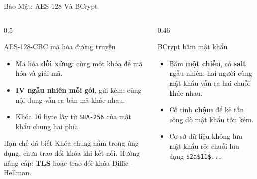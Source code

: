 \begin{frame}{Bảo Mật: AES-128 Và BCrypt}
  \begin{columns}[T]
    \begin{column}{0.5\textwidth}
      \begin{block}{AES-128-CBC \cite{ref3} mã hóa đường truyền}
        \begin{itemize}\setlength{\itemsep}{0pt}
          \item Mã hóa \textbf{đối xứng}: cùng một khóa để mã hóa và giải mã.
          \item \textbf{IV ngẫu nhiên mỗi gói}, gửi kèm: cùng nội dung vẫn ra bản mã khác nhau.
          \item Khóa 16 byte lấy từ \texttt{SHA-256} của mật khẩu chung hai phía.
        \end{itemize}
      \end{block}
      \begin{alertblock}{Hạn chế đã biết}
        Khóa chung nằm trong ứng dụng, chưa trao đổi khóa khi kết nối. Hướng nâng cấp: \textbf{TLS} hoặc trao đổi khóa Diffie--Hellman.
      \end{alertblock}
    \end{column}
    \begin{column}{0.46\textwidth}
      \begin{block}{BCrypt \cite{ref4} băm mật khẩu}
        \begin{itemize}\setlength{\itemsep}{0pt}
          \item Băm \textbf{một chiều}, có \textbf{salt} ngẫu nhiên: hai người cùng mật khẩu vẫn ra hai chuỗi khác nhau.
          \item Cố tình \textbf{chậm} để kẻ tấn công dò mật khẩu tốn kém.
          \item Cơ sở dữ liệu không lưu mật khẩu rõ; chuỗi lưu dạng \texttt{\$2a\$11\$...}
        \end{itemize}
      \end{block}
      \centering
    \end{column}
  \end{columns}
\end{frame}

